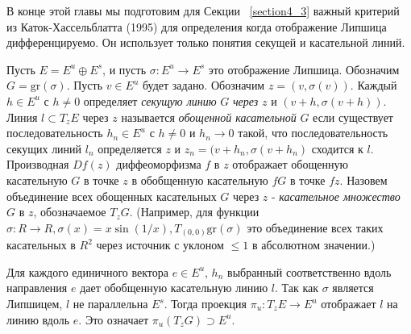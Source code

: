 В конце этой главы мы подготовим для Секции ~\ref{section4_3} важный критерий из Каток-Хассельблатта (1995) для определения когда отображение Липшица дифференцируемо. Он использует только понятия секущей и касательной линий. 

Пусть $E=E^u \oplus E^s$, и пусть $\sigma : E^u \rightarrow E^s$ это отображение Липшица. Обозначим $G = \mathrm{gr}(\sigma)$. Пусть $v \in E^u$ будет задано. Обозначим $z=(v,\sigma(v))$. Каждый $h\in E^u$ с $h \neq 0$ определяет \textit{секущую линию} $G$ \textit{через} $z$ и $(v+h, \sigma(v+h))$. Линия $l \subset T_zE$ через $z$ называется \textit{обощенной касательной} $G$ если существует последовательность $h_n \in E^u$ с $h \neq 0$ и $h_n \rightarrow 0$ такой, что последовательность секущих линий $l_n$ определяется $z$ и $z_n=(v+h_n, \sigma(v+h_n)$ сходится к $l$. Производная $Df(z)$ диффеоморфизма $f$ в $z$ отображает обощенную касательную $G$ в точке $z$ в обобщенную касательную $fG$ в точке $fz$. Назовем объединение всех обощенных касательных $G$ через $z$ - \textit{касательное множество} $G$ в $z$, обозначаемое $T_zG$. (Например, для функции $\sigma : R \rightarrow R, \sigma(x) = x \sin (1/x), T_{(0,0)}\mathrm{gr}(\sigma)$ это объединение всех таких касательных в $R^2$ через  источник с уклоном $\leq 1$ в абсолютном значении.)

Для каждого единичного вектора $e \in E^u$, $h_n$ выбранный соответственно вдоль направления $e$ дает обобщенную касательную линию $l$. Так как $\sigma$ является Липшицем, $l$ не параллельна $E^s$. Тогда проекция $\pi_u : T_zE \rightarrow E^u$ отображает $l$ на линию  вдоль $e$. Это означает $\pi_u (T_zG) \supset E^u$.

